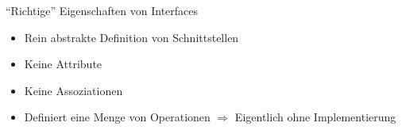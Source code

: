 \begin{frame}{"`Richtige"' Eigenschaften von Interfaces}
    \begin{itemize}
        \item Rein abstrakte Definition von Schnittstellen
        \item Keine Attribute
        \item Keine Assoziationen
        \item Definiert eine Menge von Operationen $\Rightarrow$ Eigentlich ohne Implementierung
    \end{itemize}
\end{frame}
